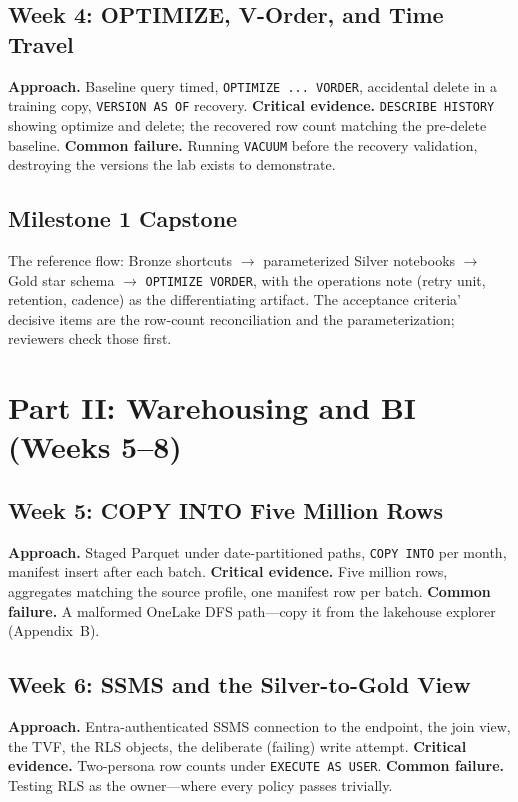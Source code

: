 \subsection{Week 4: OPTIMIZE, V-Order, and Time Travel}
\textbf{Approach.} Baseline query timed, \texttt{OPTIMIZE ... VORDER}, accidental delete in a
training copy, \texttt{VERSION AS OF} recovery. \textbf{Critical evidence.} \texttt{DESCRIBE
HISTORY} showing optimize and delete; the recovered row count matching the pre-delete baseline.
\textbf{Common failure.} Running \texttt{VACUUM} before the recovery validation, destroying the
versions the lab exists to demonstrate.

\subsection{Milestone 1 Capstone}
The reference flow: Bronze shortcuts $\rightarrow$ parameterized Silver notebooks $\rightarrow$
Gold star schema $\rightarrow$ \texttt{OPTIMIZE VORDER}, with the operations note (retry unit,
retention, cadence) as the differentiating artifact. The acceptance criteria' decisive items are
the row-count reconciliation and the parameterization; reviewers check those first.

\section{Part II: Warehousing and BI (Weeks 5--8)}
\subsection{Week 5: COPY INTO Five Million Rows}
\textbf{Approach.} Staged Parquet under date-partitioned paths, \texttt{COPY INTO} per month,
manifest insert after each batch. \textbf{Critical evidence.} Five million rows, aggregates
matching the source profile, one manifest row per batch. \textbf{Common failure.} A malformed
OneLake DFS path---copy it from the lakehouse explorer (Appendix~B).

\subsection{Week 6: SSMS and the Silver-to-Gold View}
\textbf{Approach.} Entra-authenticated SSMS connection to the endpoint, the join view, the TVF,
the RLS objects, the deliberate (failing) write attempt. \textbf{Critical evidence.} Two-persona
row counts under \texttt{EXECUTE AS USER}. \textbf{Common failure.} Testing RLS as the
owner---where every policy passes trivially.


